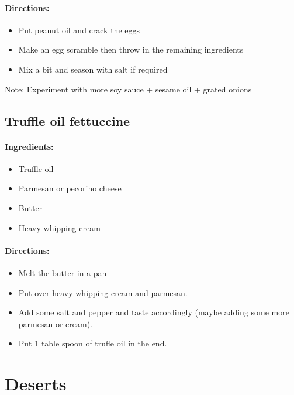 \documentclass{article}
\begin{document}
\paragraph{Directions:}
\begin{itemize}
	\item Put peanut oil and crack the eggs
	\item Make an egg scramble then throw in the remaining ingredients
	\item Mix a bit and season with salt if required

\end{itemize}

Note: Experiment with more soy sauce + sesame oil + grated onions

\subsection{Truffle oil fettuccine}

\paragraph{Ingredients:}

\begin{itemize}
	\item Truffle oil 
	\item Parmesan or pecorino cheese 
	\item Butter 
	\item Heavy whipping cream
\end{itemize}

\paragraph{Directions:}
\begin{itemize}
	\item Melt the butter in a pan
	\item Put over heavy whipping cream and parmesan.
	\item Add some salt and pepper and taste accordingly (maybe adding some more parmesan or cream).
	\item Put 1 table spoon of trufle oil in the end. 
\end{itemize}

\section{Deserts}
\end{document}
